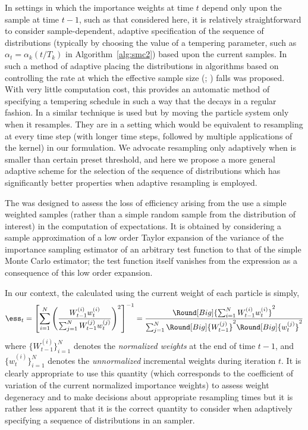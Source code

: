 In settings in which the importance weights at time $t$ depend only upon the sample at time $t-1$, such as that considered here, it is relatively straightforward to consider sample-dependent, adaptive specification of the sequence of distributions (typically by choosing the value of a tempering parameter, such as $\alpha_t = \alpha_k(t/T_k)$ in Algorithm~\ref{alg:smc2}) based upon the current samples. In \cite{Jasra:2010eh} such a method of adaptive placing the distributions in \smc algorithms based on controlling the rate at which the effective sample size (\ess; \cite{Kong:1994ul}) falls was proposed. With very little computation cost, this provides an automatic method of specifying a tempering schedule in such a way that the \ess decays in a regular fashion. In \cite[Algorithm 2]{Schafer:2011bx} a similar technique is used but by moving the particle system only when it resamples. They are in a setting which would be equivalent to resampling at every time step (with longer time steps, followed by multiple applications of the \mcmc kernel) in our formulation. We advocate resampling only adaptively when \ess is smaller than certain preset threshold, and here we propose a more general adaptive scheme for the selection of the sequence of distributions which has significantly better properties when adaptive resampling is employed.

The \ess was designed to assess the loss of efficiency arising from the use a simple weighted samples (rather than a simple random sample from the distribution of interest) in the computation of expectations. It is obtained by considering a sample approximation of a low order Taylor expansion of the variance of the importance sampling estimator of an arbitrary test function to that of the simple Monte Carlo estimator; the test function itself vanishes from the expression as a consequence of this low order expansion.

In our context, the \ess calculated using the current weight of each particle is simply,
\begin{equation}
  \ess_t = \left[ {\sum_{i=1}^N\left( \frac{W_{t-1}^{(i)}
          w_t^{(i)}}{\sum_{j=1}^NW_{t-1}^{(j)}w_t^{(j)}}\right)^2}
  \right]^{-1} = \frac{\Round[Big]{\sum_{i=1}^NW_{t-1}^{(i)}w_t^{(i)}}^2}
  {\sum_{j=1}^N\Round[Big]{W_{t-1}^{(j)}}^2\Round[Big]{w_t^{(j)}}^2}
\end{equation}
where $\{W_{t-1}^{(i)}\}_{i=1}^N$ denotes the \emph{normalized weights} at the end of time $t - 1$, and $\{w_t^{(i)}\}_{i=1}^N$ denotes the \emph{unnormalized} incremental weights during iteration $t$. It is clearly appropriate to use this quantity (which corresponds to the coefficient of variation of the current normalized importance weights) to assess weight degeneracy and to make decisions about appropriate resampling times \cite{DelMoral:2012jq} but it is rather less apparent that it is the correct quantity to consider when adaptively specifying a sequence of distributions in an \smc sampler.

